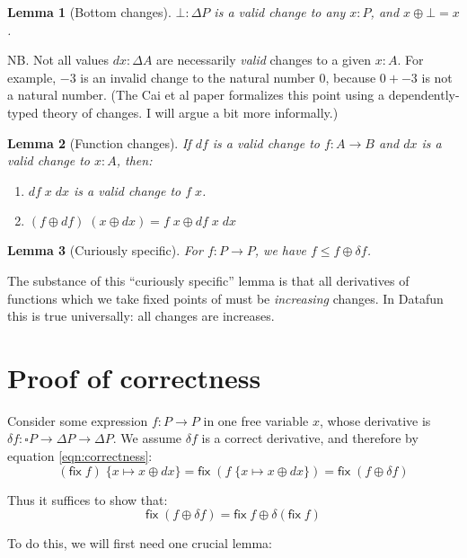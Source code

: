 \documentclass{article}
\newcommand{\ms}[1]{\ensuremath{\mathsf{#1}}}
\newcommand{\sub}[1]{\;\{{#1}\}}
\newcommand{\Disc}[1]{\square{#1}}
\newtheorem{lemma}{Lemma}
\theoremstyle{definition}
\newcommand{\fix}{\ms{fix}}
\newcommand{\dv}{\delta}
\begin{document}
\begin{lemma}[Bottom changes]
  $\bot : \Delta P$ is a valid change to any $x : P$, and $x \oplus \bot = x$.

  \label{lem:bot-change}
\end{lemma}

NB. Not all values $dx : \Delta{A}$ are necessarily \emph{valid} changes to a
given $x : A$. For example, $-3$ is an invalid change to the natural number $0$,
because $0 + -3$ is not a natural number. (The Cai et al paper formalizes this
point using a dependently-typed theory of changes. I will argue a bit more
informally.)

\begin{lemma}[Function changes]
  If $df$ is a valid change to $f : A \to B$ and $dx$ is a valid change to $x :
  A$, then:
  \begin{enumerate}
  \item $df\; x\; dx$ is a valid change to $f\;x$.
  \item \( (f \oplus df)\;(x \oplus dx) = f\;x \oplus df\;x\;dx \)
  \end{enumerate}
  \label{lem:fun-change}
\end{lemma}

\begin{lemma}[Curiously specific]
  For $f : P \to P$, we have $f \le f \oplus \dv f$.
  \label{lem:curiously-specific}
\end{lemma}

The substance of this ``curiously specific'' lemma is that all derivatives of
functions which we take fixed points of must be \emph{increasing} changes. In
Datafun this is true universally: all changes are increases.


\section{Proof of correctness}

Consider some expression $f : P \to P$ in one free variable $x$, whose
derivative is $\dv f : \Disc{P} \to \Delta P \to \Delta P$. We assume $\dv f$ is
a correct derivative, and therefore by equation \ref{eqn:correctness}:
\[
  (\fix\;f)\sub{x\mapsto x \oplus dx}
  = \fix\;(f\sub{x\mapsto x \oplus dx})
  = \fix\;(f \oplus \dv f)
\]

Thus it suffices to show that:
\[ \fix\;(f \oplus \dv f) = \fix\;f \oplus \dv(\fix\;f) \]

To do this, we will first need one crucial lemma:
\end{document}
